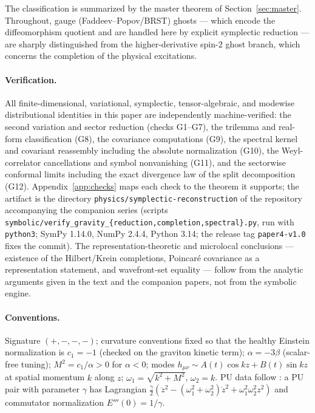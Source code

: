 \documentclass[11pt]{article}
\theoremstyle{definition}
\theoremstyle{remark}
\newcommand{\w}{\omega}
\begin{document}
The classification is summarized by the master theorem of
Section~\ref{sec:master}.  Throughout, gauge (Faddeev--Popov/BRST) ghosts
--- which encode the diffeomorphism quotient and are handled here by
explicit symplectic reduction --- are sharply distinguished from the
higher-derivative spin-$2$ ghost branch, which concerns the completion of
the physical excitations.

\paragraph{Verification.}
All finite-dimensional, variational, symplectic, tensor-algebraic, and
modewise distributional identities in this paper are independently
machine-verified: the second variation and sector reduction (checks
G1--G7), the trilemma and real-form classification (G8), the covariance
computations (G9), the spectral kernel and covariant reassembly including
the absolute normalization (G10), the Weyl-correlator cancellations and
symbol nonvanishing (G11), and the sectorwise conformal limits including
the exact divergence law of the split decomposition (G12).
Appendix~\ref{app:checks} maps each check to the theorem it supports;
the artifact is the directory \texttt{physics/symplectic-reconstruction}
of the repository accompanying the companion series
\cite{companion1,companion2,companion3} (scripts
\texttt{symbolic/verify\_gravity\_\{reduction,completion,spectral\}.py},
run with \texttt{python3}; SymPy 1.14.0, NumPy 2.4.4, Python 3.14; the
release tag \texttt{paper4-v1.0} fixes the commit).  The
representation-theoretic and microlocal conclusions --- existence of the
Hilbert/Krein completions, Poincar\'e covariance as a representation
statement, and wavefront-set equality --- follow from the analytic
arguments given in the text and the companion papers, not from the
symbolic engine.

\paragraph{Conventions.}
Signature $(+,-,-,-)$; curvature conventions fixed so that the healthy
Einstein normalization is $c_1=-1$ (checked on the graviton kinetic term);
$\alpha=-3\beta$ (scalar-free tuning); $M^2=c_1/\alpha>0$ for $\alpha<0$;
modes $h_{\mu\nu}\sim A(t)\cos kz+B(t)\sin kz$ at spatial momentum $k$
along $z$; $\w_1=\sqrt{k^2+M^2}$, $\w_2=k$.  PU data follow
\cite{companion1,companion2}: a PU pair with parameter $\gamma$ has
Lagrangian $\tfrac{\gamma}{2}(\ddot z^2-(\w_1^2+\w_2^2)\dot
z^2+\w_1^2\w_2^2z^2)$ and commutator normalization $E'''(0)=1/\gamma$.
\end{document}
